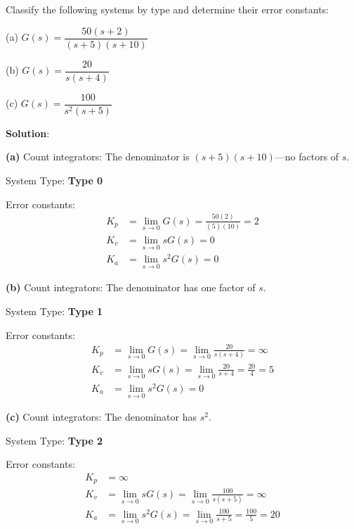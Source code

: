 \begin{examplebox}
Classify the following systems by type and determine their error constants:

(a) $G(s) = \dfrac{50(s+2)}{(s+5)(s+10)}$

(b) $G(s) = \dfrac{20}{s(s+4)}$

(c) $G(s) = \dfrac{100}{s^2(s+5)}$

\textbf{Solution}:

\textbf{(a)} Count integrators: The denominator is $(s+5)(s+10)$---no factors of $s$.

System Type: \textbf{Type 0}

Error constants:
\begin{align}
    K_p &= \lim_{s\to 0} G(s) = \frac{50(2)}{(5)(10)} = 2 \\
    K_v &= \lim_{s\to 0} sG(s) = 0 \\
    K_a &= \lim_{s\to 0} s^2G(s) = 0
\end{align}

\textbf{(b)} Count integrators: The denominator has one factor of $s$.

System Type: \textbf{Type 1}

Error constants:
\begin{align}
    K_p &= \lim_{s\to 0} G(s) = \lim_{s\to 0} \frac{20}{s(s+4)} = \infty \\
    K_v &= \lim_{s\to 0} sG(s) = \lim_{s\to 0} \frac{20}{s+4} = \frac{20}{4} = 5 \\
    K_a &= \lim_{s\to 0} s^2G(s) = 0
\end{align}

\textbf{(c)} Count integrators: The denominator has $s^2$.

System Type: \textbf{Type 2}

Error constants:
\begin{align}
    K_p &= \infty \\
    K_v &= \lim_{s\to 0} sG(s) = \lim_{s\to 0} \frac{100}{s(s+5)} = \infty \\
    K_a &= \lim_{s\to 0} s^2G(s) = \lim_{s\to 0} \frac{100}{s+5} = \frac{100}{5} = 20
\end{align}
\end{examplebox}

\vspace{1em}

